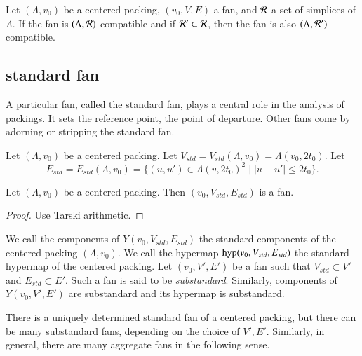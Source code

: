 \begin{lemma}
Let $(\Lambda,v_0)$ be a centered packing, $(v_0,V,E)$ a fan, and ${\mathcal R}$ a set of simplices of $\Lambda$.
If the fan is $(\Lambda,{\mathcal R})$-compatible and if
 ${\mathcal R}'\subset{\mathcal R}$, then the fan is also $(\Lambda,{\mathcal R}')$-compatible.
\end{lemma}

\subsection{standard fan}

A particular fan, called the standard fan, 
plays a central role in the analysis of
packings.  It  sets  the reference point, the point
of departure.  Other fans come by adorning  or stripping the
standard fan.


\begin{definition}
Let $(\Lambda,v_0)$ be a centered packing.  
Let $V_{std}=V_{std}(\Lambda,v_0)=\Lambda(v_0,2t_0)$.
Let 
$$E_{std} = E_{std}(\Lambda,v_0) = \{(u,u')\in \Lambda(v,2t_0)^2 \mid |u-u'|\le 2t_0\}.
$$
\end{definition}


\begin{lemma}
Let $(\Lambda,v_0)$ be a centered packing.  
Then $(v_0,V_{std},E_{std})$ is a fan.
\end{lemma}

\begin{proof}
Use Tarski arithmetic.
\end{proof}

\begin{definition}  
We call the
components of $Y(v_0,V_{std},E_{std})$ the standard components of the centered
packing $(\Lambda,v_0)$.  We call the hypermap ${\operatorname{hyp}}(v_0,V_{std},E_{std})$
the standard hypermap of the centered packing.  
Let $(v_0,V',E')$ be a fan such that $V_{std}\subset V'$ and
$E_{std}\subset E'$.  Such a fan is said to be {\it substandard}.
Similarly,  components of $Y(v_0,V',E')$ are substandard and
its hypermap is substandard.
\end{definition}

There is a uniquely determined standard fan of a centered packing,
but there can be many substandard fans, depending on the choice
of $V',E'$.  Similarly, in general, there are many aggregate fans
in the following sense.  

